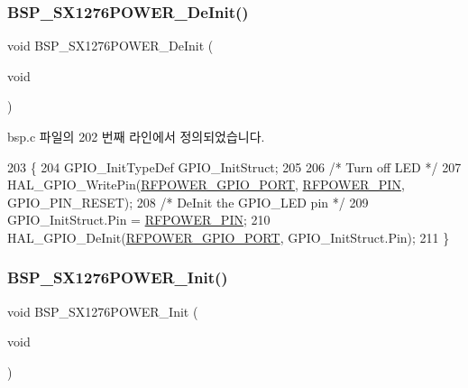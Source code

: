\subsubsection{\texorpdfstring{B\+S\+P\+\_\+\+S\+X1276\+P\+O\+W\+E\+R\+\_\+\+De\+Init()}{BSP\_SX1276POWER\_DeInit()}}
{\footnotesize\ttfamily void B\+S\+P\+\_\+\+S\+X1276\+P\+O\+W\+E\+R\+\_\+\+De\+Init (\begin{DoxyParamCaption}\item[{void}]{ }\end{DoxyParamCaption})}



bsp.\+c 파일의 202 번째 라인에서 정의되었습니다.


\begin{DoxyCode}
203 \{
204   GPIO\_InitTypeDef  GPIO\_InitStruct;
205 
206   \textcolor{comment}{/* Turn off LED */}
207   HAL\_GPIO\_WritePin(\mbox{\hyperlink{_lory_s_d_k__hw__conf_8h_a8f8e11c368ec33b36ed1ba4d84bdc555}{RFPOWER\_GPIO\_PORT}}, \mbox{\hyperlink{_lory_s_d_k__hw__conf_8h_a15fab54516f17b1b5a79b1fbfc397d79}{RFPOWER\_PIN}}, GPIO\_PIN\_RESET);
208   \textcolor{comment}{/* DeInit the GPIO\_LED pin */}
209   GPIO\_InitStruct.Pin = \mbox{\hyperlink{_lory_s_d_k__hw__conf_8h_a15fab54516f17b1b5a79b1fbfc397d79}{RFPOWER\_PIN}};
210   HAL\_GPIO\_DeInit(\mbox{\hyperlink{_lory_s_d_k__hw__conf_8h_a8f8e11c368ec33b36ed1ba4d84bdc555}{RFPOWER\_GPIO\_PORT}}, GPIO\_InitStruct.Pin);
211 \}
\end{DoxyCode}
\mbox{\label{group___s_t_m32_l1_x_x___n_u_c_l_e_o___b_u_t_t_o_n___functions_ga46ccfec03200a24f3737fc8015e2d5f7}} 
\subsubsection{\texorpdfstring{B\+S\+P\+\_\+\+S\+X1276\+P\+O\+W\+E\+R\+\_\+\+Init()}{BSP\_SX1276POWER\_Init()}}
{\footnotesize\ttfamily void B\+S\+P\+\_\+\+S\+X1276\+P\+O\+W\+E\+R\+\_\+\+Init (\begin{DoxyParamCaption}\item[{void}]{ }\end{DoxyParamCaption})}



